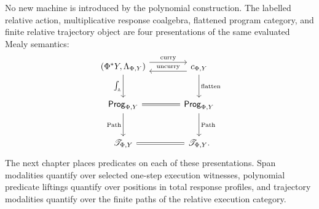 \begin{remark}
\label{rem:relative-response-final-conceptual-summary}
No new machine is introduced by the polynomial construction.  The labelled
relative action, multiplicative response coalgebra, flattened program
category, and finite relative trajectory object are four presentations of the
same evaluated Mealy semantics:
\[
\begin{tikzcd}[column sep=large,row sep=large]
    (\Phi^{\ast}Y,\Lambda_{\Phi,Y})
        \arrow[r,shift left=1.2ex,"\text{curry}"]
        \arrow[d,"\int_{\mathbb A}"']
    &
    c_{\Phi,Y}
        \arrow[l,shift left=1.2ex,"\text{uncurry}"']
        \arrow[d,"\text{flatten}"]
    \\
    \mathsf{Prog}_{\Phi,Y}
        \arrow[r,equal]
        \arrow[d,"\operatorname{Path}"']
    &
    \mathsf{Prog}_{\Phi,Y}
        \arrow[d,"\operatorname{Path}"]
    \\
    \mathscr T_{\Phi,Y}
        \arrow[r,equal]
    &
    \mathscr T_{\Phi,Y}.
\end{tikzcd}
\]
The next chapter places predicates on each of these presentations.  Span
modalities quantify over selected one-step execution witnesses, polynomial
predicate liftings quantify over positions in total response profiles, and
trajectory modalities quantify over the finite paths of the relative
execution category.
\end{remark}
